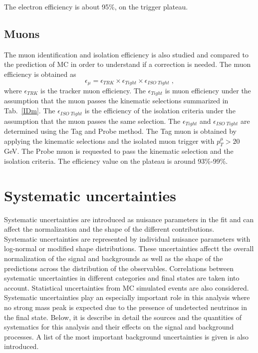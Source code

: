 The electron efficiency is about 95\%, on the trigger plateau. 


\subsection*{Muons} 
The muon identification and isolation efficiency is also studied and compared to the prediction of MC in order
to understand if a correction is needed. The muon efficiency is obtained as
\begin{equation}
\epsilon_{\mu} = \epsilon_{TRK} \times \epsilon_{Tight} \times \epsilon_{ISO \; Tight} \; ,
\end{equation}
\newline
where $ \epsilon_{TRK}$ is the tracker  muon efficiency.  
The $ \epsilon_{Tight} $ is muon efficiency
under the assumption that the muon passes the kinematic selections summarized in  Tab.~\ref{IDm}.
The $\epsilon_{ISO \; Tight}$ is the efficiency of the isolation criteria under the assumption that the muon passes the same selection.
The $\epsilon_{Tight}$ and $ \epsilon_{ISO \; Tight}$ are determined  using the Tag and Probe method. 
The Tag muon is obtained by applying  the kinematic selections  and   the isolated muon trigger  with $p_T^{\mu}>20$ GeV.
The Probe muon  is requested to pass the kinematic selection and the isolation criteria.
The efficiency value on the plateau is around 93\%-99\%.



\newpage

\section{Systematic uncertainties}\label{sec:systematics}
Systematic uncertainties are introduced as nuisance parameters in the fit and can affect the
normalization and the shape of the different contributions.\\
Systematic uncertainties are represented by individual nuisance parameters with log-normal or
modified shape distributions. These uncertainties affectt the overall normalization of the signal and
backgrounds as well as the shape of the predictions across the distribution of the observables.
Correlations between systematic uncertainties in different categories and final states are taken
into account. Statistical uncertainties from MC simulated events are also considered.
Systematic uncertainties play an especially important role in this analysis where
no strong mass peak is expected due to the presence of undetected neutrinos in the final state.
Below, it is describe in detail the sources and the quantities of systematics for this analysis and their
effects on the signal and background processes. A list of the most important background uncertainties is given is also introduced.


